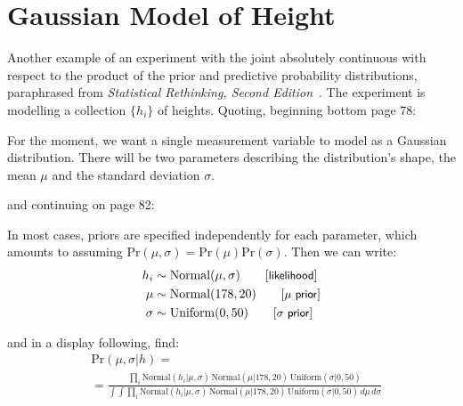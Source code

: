 \documentclass[
twoside=true,
paper=letter,
fontsize=11pt,
pagesize=auto,
leqno,
openany,
headsepline,
overfullrule,
]{scrbook}
\makeatletter
\newcommand{\reqnomode}{\tagsleft@false}
\theoremstyle{plain}
\theoremstyle{plain}
\theoremstyle{definition}
\theoremstyle{bfnoteitalic}
\theoremstyle{bfnoteroman}
\makeatother
\begin{document}
\section{Gaussian Model of Height}\label{gaussian_model}
Another example of an experiment with the joint absolutely continuous with respect to the product of the prior and predictive probability distributions,
paraphrased from \textsl{Statistical Rethinking, Second Edition}~\cite{sr_mcelreath_2020}. 
The experiment is modelling a collection $\{h_i\}$ of heights.
Quoting, beginning bottom page 78:
\begin{quoting}\small
For the moment, we want a single measurement variable to
model as a Gaussian distribution. There will be two parameters describing the distribution's
shape, the mean $\mu$ and the standard deviation $\sigma$.
\end{quoting}
and continuing on page 82:
\begin{quoting}\small
In most cases, priors are specified independently for each parameter, which amounts to assuming
$\text{Pr}(\mu,\sigma) 
= \text{Pr}(\mu)\text{Pr}(\sigma)$. 
Then we can write:\reqnomode
\begin{align*}
h_i & \sim \text{Normal}(\mu,\sigma) \tag*{[\textsf{\small{likelihood}}]} \\
\mu & \sim \text{Normal}(178,20)     \tag*{[\textsf{\small $\mu$ prior}]} \\
\sigma & \sim \text{Uniform}(0,50)   \tag*{[\textsf{\small $\sigma$ prior}]}
\end{align*}
\end{quoting}
and in a display following, find:
\begin{align*}
& \text{Pr}(\mu,\sigma\vert h) =
\\
& =
\frac{
\prod_i
\text{Normal}(h_i\vert \mu,\sigma)
\,\text{Normal}(\mu\vert 178,20)
\,\text{Uniform}(\sigma\vert 0,50)
}
{
\int\int
\prod_i
\text{Normal}(h_i\vert \mu,\sigma)
\,\text{Normal}(\mu\vert 178,20)
\,\text{Uniform}(\sigma\vert 0,50)
\,d\mu\, d\sigma
}
\\
\end{align*}
\end{document}
